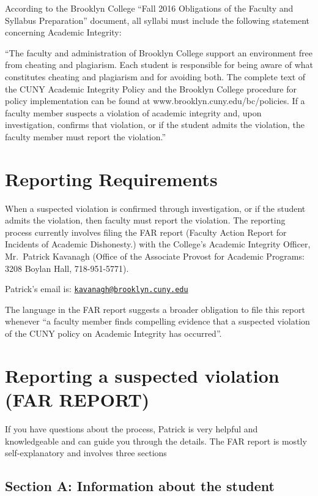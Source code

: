 \documentclass[]{book}
\theoremstyle{definition}
\theoremstyle{definition}
\theoremstyle{definition}
\theoremstyle{remark}
\begin{document}
According to the Brooklyn College ``Fall 2016 Obligations of the Faculty
and Syllabus Preparation'' document, all syllabi must include the
following statement concerning Academic Integrity:

``The faculty and administration of Brooklyn College support an
environment free from cheating and plagiarism. Each student is
responsible for being aware of what constitutes cheating and plagiarism
and for avoiding both. The complete text of the CUNY Academic Integrity
Policy and the Brooklyn College procedure for policy implementation can
be found at www.brooklyn.cuny.edu/bc/policies. If a faculty member
suspects a violation of academic integrity and, upon investigation,
confirms that violation, or if the student admits the violation, the
faculty member must report the violation.''

\section{Reporting Requirements}\label{reporting-requirements}

When a suspected violation is confirmed through investigation, or if the
student admits the violation, then faculty must report the violation.
The reporting process currently involves filing the FAR report (Faculty
Action Report for Incidents of Academic Dishonesty.) with the College's
Academic Integrity Officer, Mr.~Patrick Kavanagh (Office of the
Associate Provost for Academic Programs: 3208 Boylan Hall,
718-951-5771).

Patrick's email is:
\href{mailto:kavanagh@brooklyn.cuny.edu}{\nolinkurl{kavanagh@brooklyn.cuny.edu}}

The language in the FAR report suggests a broader obligation to file
this report whenever ``a faculty member finds compelling evidence that a
suspected violation of the CUNY policy on Academic Integrity has
occurred''.

\section{Reporting a suspected violation (FAR
REPORT)}\label{reporting-a-suspected-violation-far-report}

If you have questions about the process, Patrick is very helpful and
knowledgeable and can guide you through the details. The FAR report is
mostly self-explanatory and involves three sections

\subsection{Section A: Information about the
student}\label{section-a-information-about-the-student}
\end{document}

